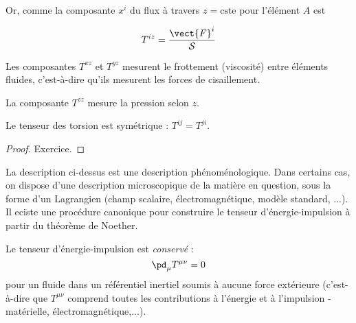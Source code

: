 Or, comme la composante $x^{i}$ du flux à travers $z = \text{cste}$ pour l'élément $A$ est 

\begin{equation}
    T^{iz} = \frac{\vect{F}^{i}}{\mathcal{S}}
\end{equation}

\begin{theoremframe}
    \begin{defi}
        Les composantes $T^{xz}$ et $T^{yz}$ mesurent le frottement (viscosité) entre éléments fluides, c'est-à-dire qu'ils mesurent les forces de cisaillement. 

        La composante $T^{zz}$ mesure la pression selon $z$. 
    \end{defi}
\end{theoremframe}
\begin{theoremframe}
    \begin{propri}
        Le tenseur des torsion est symétrique : $T^{ij} = T^{ji}$.
    \end{propri}
\end{theoremframe}
\begin{proof}
    Exercice.
\end{proof}
\begin{rmk}
    La description ci-dessus est une description phénoménologique. Dans certains cas, on dispose d'une description microscopique de la matière en question, sous la forme d'un Lagrangien (champ scalaire, électromagnétique, modèle standard, ...). Il eciste une procédure canonique pour construire le tenseur d'énergie-impulsion à partir du théorème de Noether.
\end{rmk}
\begin{theoremframe}
    \begin{propri}
        Le tenseur d'énergie-impulsion est \emph{conservé} :
        \begin{equation}
            \pd_\mu T^{\mu\nu} = 0
        \end{equation}
        pour un fluide dans un référentiel inertiel soumis à aucune force extérieure (c'est-à-dire que $T^{\mu \nu}$ comprend toutes les contributions à l'énergie et à l'impulsion - matérielle, électromagnétique,...).
    \end{propri}
\end{theoremframe}
